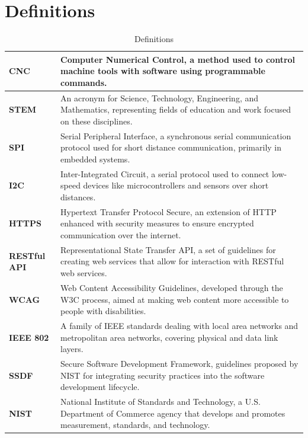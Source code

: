 \section{Definitions}
\begin{table}[H]
\centering
\begin{tabular}{|p{2cm}|p{15cm}|}
\hline
\textbf{CNC} & Computer Numerical Control, a method used to control machine tools with software using programmable commands.\\
\hline
\textbf{STEM} & An acronym for Science, Technology, Engineering, and Mathematics, representing fields of education and work focused on these disciplines. \\
\hline
\textbf{SPI} & Serial Peripheral Interface, a synchronous serial communication protocol used for short distance communication, primarily in embedded systems. \\
\hline
\textbf{I2C} & Inter-Integrated Circuit, a serial protocol used to connect low-speed devices like microcontrollers and sensors over short distances. \\
\hline
\textbf{HTTPS} & Hypertext Transfer Protocol Secure, an extension of HTTP enhanced with security measures to ensure encrypted communication over the internet. \\
\hline
\textbf{RESTful API} & Representational State Transfer API, a set of guidelines for creating web services that allow for interaction with RESTful web services. \\
\hline
\textbf{WCAG} & Web Content Accessibility Guidelines, developed through the W3C process, aimed at making web content more accessible to people with disabilities. \\
\hline
\textbf{IEEE 802} & A family of IEEE standards dealing with local area networks and metropolitan area networks, covering physical and data link layers. \\
\hline
\textbf{SSDF} & Secure Software Development Framework, guidelines proposed by NIST for integrating security practices into the software development lifecycle. \\
\hline
\textbf{NIST} & National Institute of Standards and Technology, a U.S. Department of Commerce agency that develops and promotes measurement, standards, and technology. \\
\hline
\end{tabular}
\caption{Definitions}
\end{table}


